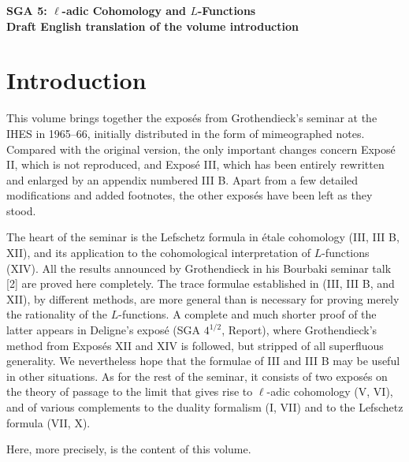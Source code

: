 \documentclass[11pt]{article}
\begin{document}
\begin{center}
{\Large \textbf{SGA 5: $\ell$-adic Cohomology and $L$-Functions}}\\[0.5em]
\textbf{Draft English translation of the volume introduction}
\end{center}

\section*{Introduction}

This volume brings together the exposés from Grothendieck's seminar at the IHES in 1965--66, initially distributed in the form of mimeographed notes. Compared with the original version, the only important changes concern Exposé II, which is not reproduced, and Exposé III, which has been entirely rewritten and enlarged by an appendix numbered III B. Apart from a few detailed modifications and added footnotes, the other exposés have been left as they stood.

The heart of the seminar is the Lefschetz formula in étale cohomology (III, III B, XII), and its application to the cohomological interpretation of $L$-functions (XIV). All the results announced by Grothendieck in his Bourbaki seminar talk [2] are proved here completely. The trace formulae established in (III, III B, and XII), by different methods, are more general than is necessary for proving merely the rationality of the $L$-functions. A complete and much shorter proof of the latter appears in Deligne's exposé (SGA $4^{1/2}$, Report), where Grothendieck's method from Exposés XII and XIV is followed, but stripped of all superfluous generality. We nevertheless hope that the formulae of III and III B may be useful in other situations. As for the rest of the seminar, it consists of two exposés on the theory of passage to the limit that gives rise to $\ell$-adic cohomology (V, VI), and of various complements to the duality formalism (I, VII) and to the Lefschetz formula (VII, X).

Here, more precisely, is the content of this volume.
\end{document}
